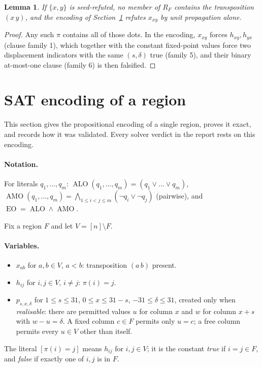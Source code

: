 \documentclass[11pt,a4paper]{article}
\newtheorem{lemma}[theorem]{Lemma}
\theoremstyle{definition}
\newcommand{\ALO}{\operatorname{ALO}}
\newcommand{\AMO}{\operatorname{AMO}}
\newcommand{\EO}{\operatorname{EO}}
\begin{document}
\begin{lemma}\label{lem:seed}
If $\{x,y\}$ is seed-refuted, no member of $R_F$ contains the transposition $(x\,y)$, and the
encoding of Section~\ref{sec:encoding} refutes $x_{xy}$ by unit propagation alone.
\end{lemma}
\begin{proof}
Any such $\pi$ contains all of those dots. In the encoding, $x_{xy}$ forces $h_{xy},h_{yx}$
(clause family 1), which together with the constant fixed-point values force two
displacement indicators with the same $(s,\delta)$ true (family 5), and their binary
at-most-one clause (family 6) is then falsified.
\end{proof}

\section{SAT encoding of a region}\label{sec:encoding}
This section gives the propositional encoding of a single region, proves it exact, and records how it was validated. Every solver verdict in the report rests on this encoding.


\paragraph{Notation.} For literals $q_1,\dots,q_m$:
$\ALO(q_1,\dots,q_m)=(q_1\vee\dots\vee q_m)$,
$\AMO(q_1,\dots,q_m)=\bigwedge_{1\le i<j\le m}(\neg q_i\vee\neg q_j)$ (pairwise), and
$\EO=\ALO\wedge\AMO$.

Fix a region $F$ and let $V=[n]\setminus F$.

\paragraph{Variables.}
\begin{itemize}
\item $x_{ab}$ for $a,b\in V$, $a<b$: transposition $(a\,b)$ present.
\item $h_{ij}$ for $i,j\in V$, $i\ne j$: $\pi(i)=j$.
\item $p_{s,x,\delta}$ for $1\le s\le 31$, $0\le x\le 31-s$, $-31\le\delta\le 31$, created only
when \emph{realisable}: there are permitted values $u$ for column $x$ and $w$ for column $x+s$
with $w-u=\delta$. A fixed column $c\in F$ permits only $u=c$; a free column permits every
$u\in V$ other than itself.
\end{itemize}
The literal $[\pi(i)=j]$ means $h_{ij}$ for $i,j\in V$; it is the constant \emph{true} if
$i=j\in F$, and \emph{false} if exactly one of $i,j$ is in $F$.
\end{document}
